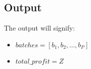 \documentclass{article}
\begin{document}
\subsection*{Output}
The output will signify:
\begin{itemize}
    \item \( batches = [b_1, b_2, \ldots, b_P] \)
    \item \( total\_profit = Z \)
\end{itemize}
\end{document}
